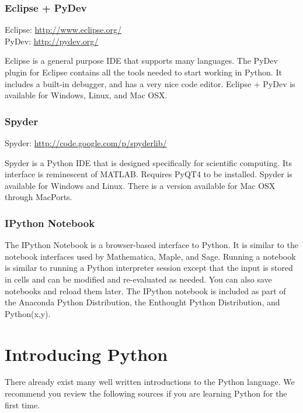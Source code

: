 \subsubsection*{Eclipse + PyDev}

Eclipse: \url{http://www.eclipse.org/} \\
PyDev: \url{http://pydev.org/}

Eclipse is a general purpose IDE that supports many languages.  
The PyDev plugin for Eclipse contains all the tools needed to start working in Python.
It includes a built-in debugger, and has a very nice code editor. 
Eclipse + PyDev is available for Windows, Linux, and Mac OSX.

\subsubsection*{Spyder}

Spyder: \url{http://code.google.com/p/spyderlib/}

Spyder is a Python IDE that is designed specifically for scientific computing. 
Its interface is reminescent of MATLAB. 
Requires PyQT4 to be installed. 
Spyder is available for Windows and Linux.  
There is a version available for Mac OSX through MacPorts.

\subsubsection*{IPython Notebook}
The IPython Notebook is a browser-based interface to Python.
It is similar to the notebook interfaces used by Mathematica, Maple, and Sage.
Running a notebook is similar to running a Python interpreter session except that the input is stored in cells and can be modified and re-evaluated as needed.
You can also save notebooks and reload them later.
The IPython notebook is included as part of the Anaconda Python Distribution, the Enthought Python Distribution, and Python(x,y).

\section*{Introducing Python}
There already exist many well written introductions to the Python language. 
We recommend you review the following sources if you are learning Python for the first time.

